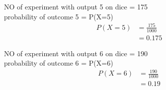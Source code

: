 NO of experiment with output 5 on dice = 175
\\
probability of outcome 5 = P(X=5)
\begin{align}
P\left(X=5\right) &= \frac{175}{1000}
\\
&= 0.175
\end{align}

NO of experiment with output 6 on dice = 190
\\
probability of outcome 6 = P(X=6)
\begin{align}
P\left(X=6\right) &= \frac{190}{1000}
\\
&= 0.19
\end{align}
